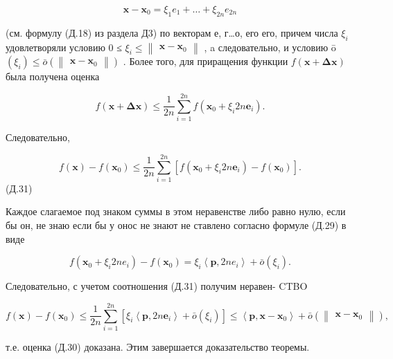 \documentclass[8pt]{extarticle}
\begin{document}
\[
\mathbf{x} - {\mathbf{x}}_{0} = {\xi }_{1}{e}_{1} + \ldots  + {\xi }_{2n}{e}_{2n}
\]

(см. формулу (Д.18) из раздела Д3) по векторам е, г…о, его его, причем числа \({\xi }_{i}\) удовлетворяли условию 0 ≤ \({\xi }_{i} \leq  \left\lVert \begin{array}{c} {\mathbf{x} - {\mathbf{x}}_{0}} \end{array} \right\rVert\) , a следовательно, и условию ō \(\left( {\xi }_{i}\right)  \leq  \bar{o}\left( \left\lVert \begin{array}{c} {\mathbf{x} - {\mathbf{x}}_{0}} \end{array} \right\rVert\right)\) . Более того, для приращения функции \(f\left( {\mathbf{x} + \mathbf{{\Delta x}}}\right)\) была получена оценка

\[
f\left( {\mathbf{x} + \mathbf{\Delta }\mathbf{x}}\right)  \leq  \frac{1}{2n}\mathop{\sum }\limits_{{i = 1}}^{{2n}}f\left( {{\mathbf{x}}_{0} + {\xi }_{i}{2n}{\mathbf{e}}_{i}}\right) .
\]

Следовательно,

\[
f\left( \mathbf{x}\right)  - f\left( {\mathbf{x}}_{0}\right)  \leq  \frac{1}{2n}\mathop{\sum }\limits_{{i = 1}}^{{2n}}\left\lbrack  {f\left( {{\mathbf{x}}_{0} + {\xi }_{i}{2n}{\mathbf{e}}_{i}}\right)  - f\left( {\mathbf{x}}_{0}\right) }\right\rbrack  .
\]
 (Д.31)

Каждое слагаемое под знаком суммы в этом неравенстве либо равно нулю, если бы он, не знаю если бы у онос не знают не ставлено согласно формуле (Д.29) в виде

\[
f\left( {{\mathbf{x}}_{0} + {\xi }_{i}{2n}{e}_{i}}\right)  - f\left( {\mathbf{x}}_{0}\right)  = {\xi }_{i}\left\langle  {\mathbf{p},{2n}{e}_{i}}\right\rangle   + \bar{o}\left( {\xi }_{i}\right) .
\]

Следовательно, с учетом соотношения (Д.31) получим неравен- CTBO

\[
f\left( \mathbf{x}\right)  - f\left( {\mathbf{x}}_{0}\right)  \leq  \frac{1}{2n}\mathop{\sum }\limits_{{i = 1}}^{{2n}}\left\lbrack  {{\xi }_{i}\left\langle  {\mathbf{p},{2n}{\mathbf{e}}_{i}}\right\rangle   + \bar{o}\left( {\xi }_{i}\right) }\right\rbrack   \leq  \left\langle  {\mathbf{p},\mathbf{x} - {\mathbf{x}}_{0}}\right\rangle   + \bar{o}\left( \left\lVert \begin{array}{c} {\mathbf{x} - {\mathbf{x}}_{0}} \end{array} \right\rVert\right) ,
\]

т.е. оценка (Д.30) доказана. Этим завершается доказательство теоремы.
\end{document}
